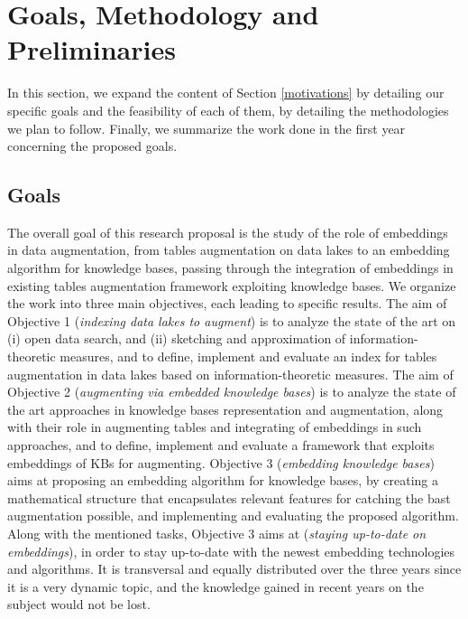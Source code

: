 \section{Goals, Methodology and Preliminaries}\label{goals}

In this section, we expand the content of Section \ref{motivations} by detailing our specific goals and the feasibility of each of them, by detailing the methodologies we plan to follow. Finally, we summarize the work done in the first year concerning the proposed goals.


\subsection{Goals}\label{sub_goals}

The overall goal of this research proposal is the study of the role of embeddings in data augmentation, from tables augmentation on data lakes to an embedding algorithm for knowledge bases, passing through the integration of embeddings in existing tables augmentation framework exploiting knowledge bases. We organize the work into three main objectives, each leading to specific results. 
The aim of Objective 1 (\textit{indexing data lakes to augment}) is to analyze the state of the art on (i) open data search, and (ii) sketching and approximation of information-theoretic measures, and to define, implement and evaluate an index for tables augmentation in data lakes based on information-theoretic measures. 
The aim of Objective 2 (\textit{augmenting via embedded knowledge bases}) is to analyze the state of the art approaches in knowledge bases representation and augmentation, along with their role in augmenting tables and integrating of embeddings in such approaches, and to define, implement and evaluate a framework that exploits embeddings of KBs for augmenting. 
Objective 3 (\textit{embedding knowledge bases}) aims at proposing an embedding algorithm for knowledge bases, by creating a mathematical structure that encapsulates relevant features for catching the bast augmentation possible, and implementing and evaluating the proposed algorithm. Along with the mentioned tasks, Objective 3 aims at (\textit{staying up-to-date on embeddings}), in order to stay up-to-date with the newest embedding technologies and algorithms. It is transversal and equally distributed over the three years since it is a very dynamic topic, and the knowledge gained in recent years on the subject would not be lost.  

